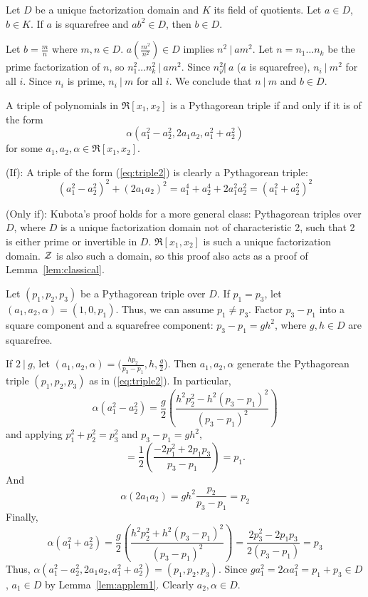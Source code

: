 \begin{lemma}
\label{lem:applem1}
Let $D$ be a unique factorization domain and $K$ its field of quotients.
Let $a \in D$, $b \in K$.
If $a$ is squarefree and $ab^2 \in D$, then $b \in D$.
\end{lemma}
\prf
Let $b = \frac{m}{n}$ where $m,n \in D$.
$a(\frac{m^2}{n^2}) \in D$ implies $n^2 \ | \ am^2$.
Let $n = n_1 \ldots n_k$ be the prime factorization of $n$,
so $n_1^2 \ldots n_k^2 \ | \ am^2$.
Since $n_i^2 \not | \ a$ ($a$ is squarefree),
$n_i \ | \ m^2$ for all $i$.
Since $n_i$ is prime, $n_i \ | \ m$ for all $i$.
We conclude that $n \ | \ m$ and $b \in D$.
\QED

\begin{lemma}[Kubota 1972]
\label{lem:kubota2}
A triple of polynomials in $\Re[x_1,x_2]$ is a Pythagorean triple 
if and only if it is of the form 
\begin{equation}
\label{eq:triple2}
	\alpha(a_1^2 - a_2^2, 2a_1a_2, a_1^2 + a_2^2)
\end{equation}
for some $a_1,a_2,\alpha \in \Re[x_1,x_2]$.
\end{lemma}
\prf
(If):  A triple of the form (\ref{eq:triple2}) is clearly a Pythagorean triple:
\[
	(a_1^2 - a_2^2)^2 + (2a_1a_2)^2 = 
	a_1^4 + a_2^4 + 2a_1^2a_2^2 = (a_1^2 + a_2^2)^2
\]

(Only if): 
Kubota's proof holds for a more general class: Pythagorean triples
over $D$, where $D$ is a unique factorization domain 
not of characteristic 2, such that 2 is either prime 
or invertible in $D$.
$\Re[x_1,x_2]$ is such a unique factorization domain.
${\cal Z}$ is also such a domain, so this proof also acts
as a proof of Lemma~\ref{lem:classical}.

Let $(p_1,p_2,p_3)$ be a Pythagorean triple over $D$.
If $p_1=p_3$, let $(a_1,a_2,\alpha) = (1,0,p_1)$.
Thus, we can assume $p_1 \neq p_3$.
Factor $p_3 - p_1$ into a square component and a squarefree component:
$p_3 - p_1 = gh^2$, where $g,h \in D$ are squarefree.

If $2 \ | \ g$, let $(a_1,a_2,\alpha) = (\frac{hp_2}{p_3 - p_1}, h, \frac{g}{2}$).
Then $a_1,a_2,\alpha$ generate the Pythagorean triple $(p_1,p_2,p_3)$
as in (\ref{eq:triple2}).
In particular,
\[
\alpha (a_1^2 - a_2^2)
= \frac{g}{2} 
  (\frac{h^2p_2^2 - h^2(p_3 - p_1)^2}{(p_3-p_1)^2})
\]
and applying $p_1^2 + p_2^2 = p_3^2$ and $p_3 - p_1 = gh^2$,
\[
= \frac{1}{2} (\frac{-2p_1^2 + 2p_1p_3}{p_3 - p_1}) = p_1.
\]
And
\[
\alpha (2a_1 a_2) = gh^2 \frac{p_2}{p_3 - p_1} = p_2
\]
Finally, 
\[
\alpha(a_1^2 + a_2^2)
= \frac{g}{2} 
  (\frac{h^2p_2^2 + h^2(p_3 - p_1)^2}{(p_3-p_1)^2})
= \frac{2p_3^2 - 2p_1p_3}{2(p_3-p_1)} = p_3
\]
Thus, $\alpha (a_1^2 - a_2^2, 2a_1a_2, a_1^2 + a_2^2) = (p_1,p_2,p_3)$.
Since $ga_1^2 = 2 \alpha a_1^2 = p_1 + p_3 \in D$, 
$a_1 \in D$ by Lemma~\ref{lem:applem1}.
Clearly $a_2,\alpha \in D$.

